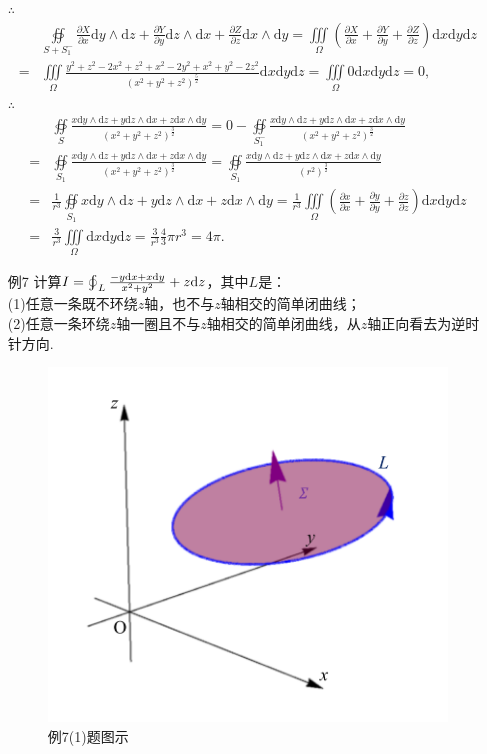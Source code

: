 \documentclass[12pt,UTF8,fleqn]{ctexart}
\newcommand{\varIIInt}[5]{\iiint\limits_{#1}#2\mathrm d#3\mathrm d#4\mathrm d#5}
\newcommand{\BLOInt}[2]{\varoint\nolimits_{#1}#2}
\newcommand{\md}[1]{\mathrm d#1}
\newcommand{\pp}[2]{\frac{\partial #1}{\partial #2}}
\newcommand{\BSOIInt}[2]{\oiint\limits_{#1}#2}
\begin{document}
\begin{enumerate}
$\therefore$
\[\begin{aligned}
&\BSOIInt{S+S_1^-}{\pp Xx\md y\wedge\md z+\pp Yy\md z\wedge\md x+\pp Zz\md x\wedge\md y}=\varIIInt\Omega{(\pp Xx+\pp Yy+\pp Zz)}xyz\\
=&\varIIInt\Omega{\frac{y^2+z^2-2x^2+z^2+x^2-2y^2+x^2+y^2-2z^2}{(x^2+y^2+z^2)^{\frac52}}}xyz=\varIIInt\Omega{0}xyz=0,
\end{aligned}\]
$\therefore$
\[\begin{aligned}
&\BSOIInt S{\frac{x\md y\wedge\md z+y\md z\wedge\md x+z\md x\wedge\md y}{(x^2+y^2+z^2)^{\frac32}}}=0-\BSOIInt{S_1^-}{\frac{x\md y\wedge\md z+y\md z\wedge\md x+z\md x\wedge\md y}{(x^2+y^2+z^2)^{\frac32}}}\\
=&\BSOIInt{S_1}{\frac{x\md y\wedge\md z+y\md z\wedge\md x+z\md x\wedge\md y}{(x^2+y^2+z^2)^{\frac32}}}=\BSOIInt{S_1}{\frac{x\md y\wedge\md z+y\md z\wedge\md x+z\md x\wedge\md y}{(r^2)^{\frac32}}}\\=&\frac1{r^3}\BSOIInt{S_1}{x\md y\wedge\md z+y\md z\wedge\md x+z\md x\wedge\md y}=\frac1{r^3}\varIIInt\Omega{(\pp xx+\pp yy+\pp zz)}xyz\\
=&\frac3{r^3}\varIIInt\Omega{}xyz=\frac3{r^3}\frac43\pi r^3=4\pi.
\end{aligned}\]

\item[例7]计算$I=\BLOInt L{\frac{-y\md x+x\md y}{x^2+y^2}+z\md z}$，其中$L$是：\\
(1)任意一条既不环绕$z$轴，也不与$z$轴相交的简单闭曲线；\\
(2)任意一条环绕$z$轴一圈且不与$z$轴相交的简单闭曲线，从$z$轴正向看去为逆时针方向.

\begin{figure}[H]
\begin{center}
\includegraphics[height=0.5\textheight]{Figures24/Fig13-5-3-1.pdf}
\end{center}
\caption{例7(1)题图示}
\label{13-5-3-1}
\end{figure}


\end{enumerate}
\end{document}
